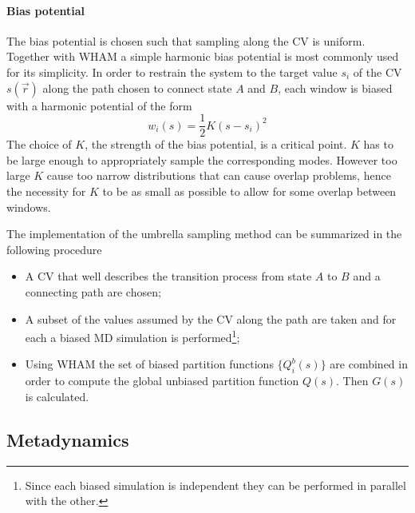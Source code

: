 \paragraph{\textbf{Bias potential}} The bias potential is chosen such that sampling along the \ac{CV} is uniform.
Together with \ac{WHAM} a simple harmonic bias potential is most commonly used for its simplicity. In order to
restrain the system to the target value $s_i$ of the \ac{CV} $s(\vec r)$ along the path chosen to connect state
$A$ and $B$, each window is biased with a harmonic potential of the form
\begin{equation*}
	w_i(s) = \frac{1}{2}K (s - s_i)^2
\end{equation*}
The choice of $K$, the strength of the bias potential, is a critical point. $K$ has to be large enough to
appropriately sample the corresponding modes. However too large $K$ cause too narrow distributions that can cause
overlap problems, hence the necessity for $K$ to be as small as possible to allow for some overlap between
windows.


\bigskip The implementation of the umbrella sampling method can be summarized in the following procedure
\begin{itemize}
	\item A \ac{CV} that well describes the transition process from state $A$ to $B$ and a connecting path are chosen;%
	\item A subset of the values assumed by the \ac{CV} along the path are taken and for each a biased \ac{MD} simulation is performed\footnote{Since each biased simulation is independent they can be performed in parallel with the other.};%
	\item Using \ac{WHAM} the set of biased partition functions $\{Q^b_i(s)\}$ are combined in order to compute the global unbiased partition function $Q(s)$. Then $G(s)$ is calculated.%
\end{itemize}


\subsection{Metadynamics}
\label{sec:metadynamics}

